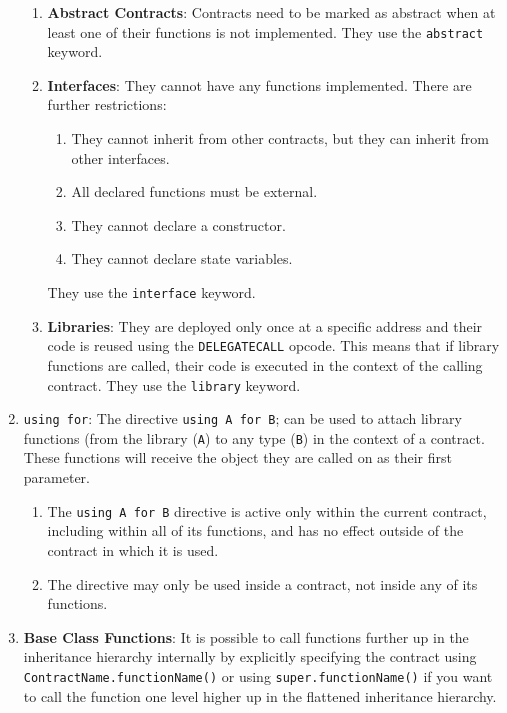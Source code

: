 \begin{enumerate}
\begin{enumerate}
	\item\textbf{Abstract Contracts}: Contracts need to be marked as abstract when at least one of their functions is not implemented. They use the \verb|abstract| keyword.
	\item\textbf{Interfaces}: They cannot have any functions implemented. There are further restrictions:
	\begin{enumerate}
	\item They cannot inherit from other contracts, but they can inherit from other interfaces.
	\item All declared functions must be external.
	\item They cannot declare a constructor.
	\item They cannot declare state variables.
	\end{enumerate}
	They use the \verb|interface| keyword.
	\item\textbf{Libraries}: They are deployed only once at a specific address and their code is reused using the \verb|DELEGATECALL| opcode. This means that if library functions are called, their code is executed in the context of the calling contract. They use the \verb|library| keyword.
\end{enumerate}

\item \verb|using for|: The directive \verb|using A for B|; can be used to attach library functions (from the library (\verb|A|) to any type (\verb|B|) in the context of a contract. These functions will receive the object they are called on as their first parameter.

\begin{enumerate}
	\item The \verb|using A for B| directive is active only within the current contract, including within all of its functions, and has no effect outside of the contract in which it is used.
	\item The directive may only be used inside a contract, not inside any of its functions.
\end{enumerate}

\item\textbf{Base Class Functions}: It is possible to call functions further up in the inheritance hierarchy internally by explicitly specifying the contract using \verb|ContractName.functionName()| or using \verb|super.functionName()| if you want to call the function one level higher up in the flattened inheritance hierarchy.


\end{enumerate}
